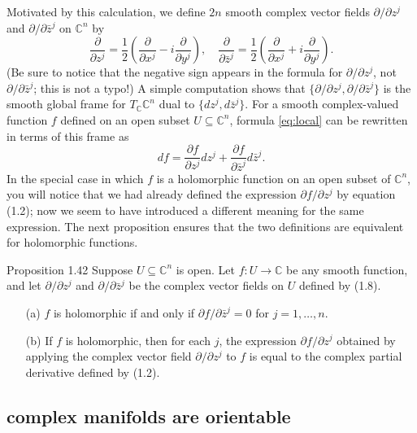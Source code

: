 Motivated by this calculation, we define $2n$ smooth complex vector fields $\partial/\partial z^j$ and $\partial/\partial \bar{z}^j$ on $\mathbb{C}^n$ by
\begin{equation*}
\frac{\partial}{\partial z^j} = \frac{1}{2}\left(\frac{\partial}{\partial x^j} - i\frac{\partial}{\partial y^j}\right), \quad
\frac{\partial}{\partial \bar{z}^j} = \frac{1}{2}\left(\frac{\partial}{\partial x^j} + i\frac{\partial}{\partial y^j}\right).
\end{equation*}
(Be sure to notice that the negative sign appears in the formula for $\partial/\partial z^j$, not $\partial/\partial \bar{z}^j$; this is not a typo!) A simple computation shows that $\{\partial/\partial z^j, \partial/\partial \bar{z}^j\}$ is the smooth global frame for $T_\mathbb{C}\mathbb{C}^n$ dual to $\{dz^j, d\bar{z}^j\}$. For a smooth complex-valued function $f$ defined on an open subset $U \subseteq \mathbb{C}^n$, formula \cref{eq:local} can be rewritten in terms of this frame as
\begin{equation*}
  df = \frac{\partial f}{\partial z^j} dz^j + \frac{\partial f}{\partial \bar{z}^j} d\bar{z}^j.
\end{equation*}
In the special case in which $f$ is a holomorphic function on an open subset of $\mathbb{C}^n$, you will notice that we had already defined the expression $\partial f/\partial z^j$ by equation (1.2); now we seem to have introduced a different meaning for the same expression. The next proposition ensures that the two definitions are equivalent for holomorphic functions.

\begin{thing4}{Proposition 1.42}\label{prop:1.42}\leavevmode
Suppose $U \subseteq \mathbb{C}^n$ is open. Let $f : U \to \mathbb{C}$ be any smooth function, and let $\partial/\partial z^j$ and $\partial/\partial \bar{z}^j$ be the complex vector fields on $U$ defined by (1.8).
\begin{itemize}
    \item[(a)] $f$ is holomorphic if and only if $\partial f/\partial \bar{z}^j = 0$ for $j = 1, \dots, n$.
    \item[(b)] If $f$ is holomorphic, then for each $j$, the expression $\partial f/\partial z^j$ obtained by applying the complex vector field $\partial/\partial z^j$ to $f$ is equal to the complex partial derivative defined by (1.2).
\end{itemize}
\end{thing4}

\subsection{complex manifolds are orientable}

